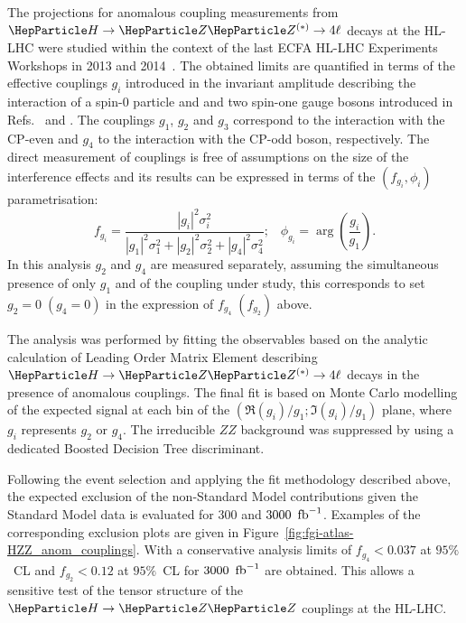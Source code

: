 
The projections for anomalous coupling measurements from $\hzzllll$ decays at the HL-LHC were studied within the context of the last ECFA HL-LHC Experiments Workshops in 2013 and 2014~\cite{ATL-PHYS-PUB-2013-013}.
The obtained limits are quantified 
in terms of the effective couplings $g_i$  introduced in the invariant amplitude describing the interaction of a spin-0 particle and and two spin-one gauge bosons
introduced in Refs.~\cite{Gao:2010qx} and \cite{Heinemeyer:2013tqa}. The couplings $g_1$, $g_2$ and $g_3$ correspond to the 
interaction with the CP-even and $g_4$ to the interaction with the CP-odd boson, respectively.
The direct measurement of couplings is free of assumptions on the size of the interference effects and its results can be 
expressed in terms of the $(f_{g_i}, \phi_i)$ parametrisation:
$$
f_{g_i} =\frac{|g_i|^2 \sigma _i ^2}{|g_1|^2 \sigma _1 ^2 + |g_2|^2 \sigma _2 ^2 + |g_4|^2 \sigma _4 ^2}; \;\;\; \phi _{g_i} = \arg \left ( \frac{g_i}{g_1} \right ).
$$
In this analysis $g_2$ and $g_4$ are measured separately, assuming the simultaneous presence of
only $g_1$ and of the coupling under study, this corresponds to set $g_2 = 0\; (g_4 = 0)$ in the expression of $f_{g_4}\;
( f_{g_2} )$ above.

The analysis was performed by fitting the observables based on the analytic calculation of Leading Order Matrix Element describing 
 $\hzzllll$ decays in the presence of anomalous couplings. The final fit is based on Monte Carlo modelling of the expected
signal at each bin of the $(\Re (g_i)/g_1; \Im (g_i) /g_1)$ plane, where $g_i$ represents $g_2$ or $g_4$. The irreducible $ZZ$ background 
 was suppressed by using a dedicated Boosted Decision Tree discriminant.  
 
 
Following the event selection and applying the fit methodology described above, the expected exclusion
of the non-Standard Model contributions given the Standard Model data is evaluated for $300$ and $3000~\mbox{\ensuremath{\,\text{fb}^\text{$-$1}}}$.
Examples of the corresponding exclusion plots are given in Figure~\ref{fig:fgi-atlas-HZZ_anom_couplings}. With a conservative analysis limits of $f_{g_4} < 0.037$ at $95\%$~CL and 
$f_{g_2} < 0.12$ at $95\%$~CL for $3000~\mbox{\ensuremath{\,\text{fb}^\text{$-$1}}}$ are obtained. This allows a sensitive test of the tensor structure of the $\hzz$ couplings at the HL-LHC.

